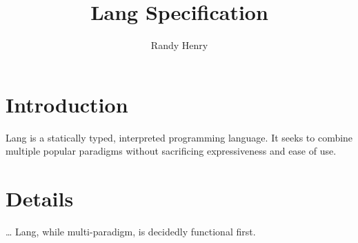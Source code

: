 \documentclass[a4paper,12pt]{article}
\author{Randy Henry}
\title{Lang Specification}
\begin{document}
    \maketitle
    \tableofcontents

    \section{Introduction}
        Lang is a statically typed, interpreted programming language.
        It seeks to combine multiple popular paradigms without sacrificing
        expressiveness and ease of use.

    \section{Details} 
        \ldots{} Lang, while multi-paradigm, is decidedly functional first.
       
\end{document}
